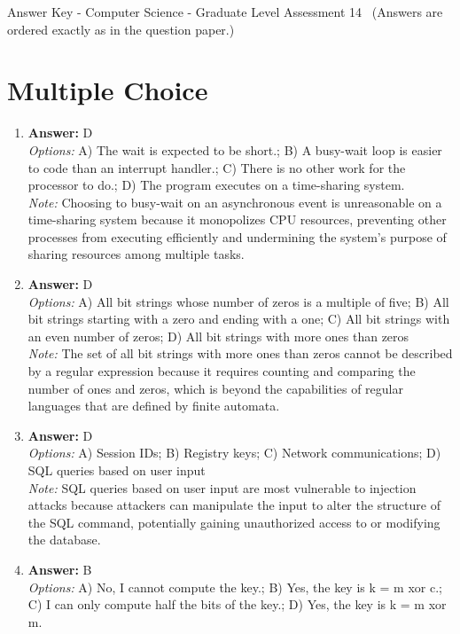 \documentclass[12pt]{article}
\begin{document}
\begin{center}
Answer Key - Computer Science - Graduate Level Assessment 14 \
\small (Answers are ordered exactly as in the question paper.)
\end{center}

\section*{Multiple Choice}
\begin{enumerate}[label=\arabic*.]
\item \textbf{Answer:} D
\\ \textit{Options:} A) The wait is expected to be short.; B) A busy-wait loop is easier to code than an interrupt handler.; C) There is no other work for the processor to do.; D) The program executes on a time-sharing system.
\\ \textit{Note:} Choosing to busy-wait on an asynchronous event is unreasonable on a time-sharing system because it monopolizes CPU resources, preventing other processes from executing efficiently and undermining the system's purpose of sharing resources among multiple tasks.
\item \textbf{Answer:} D
\\ \textit{Options:} A) All bit strings whose number of zeros is a multiple of five; B) All bit strings starting with a zero and ending with a one; C) All bit strings with an even number of zeros; D) All bit strings with more ones than zeros
\\ \textit{Note:} The set of all bit strings with more ones than zeros cannot be described by a regular expression because it requires counting and comparing the number of ones and zeros, which is beyond the capabilities of regular languages that are defined by finite automata.
\item \textbf{Answer:} D
\\ \textit{Options:} A) Session IDs; B) Registry keys; C) Network communications; D) SQL queries based on user input
\\ \textit{Note:} SQL queries based on user input are most vulnerable to injection attacks because attackers can manipulate the input to alter the structure of the SQL command, potentially gaining unauthorized access to or modifying the database.
\item \textbf{Answer:} B
\\ \textit{Options:} A) No, I cannot compute the key.; B) Yes, the key is k = m xor c.; C) I can only compute half the bits of the key.; D) Yes, the key is k = m xor m.

\end{enumerate}
\end{document}
